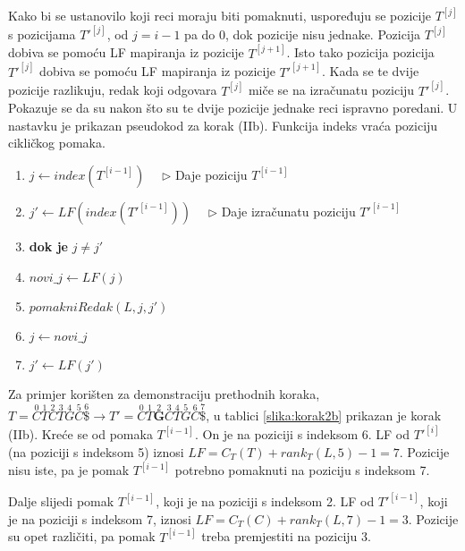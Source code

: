 \documentclass{ferseminar}
\begin{document}
Kako bi se ustanovilo koji reci moraju biti pomaknuti, uspoređuju se pozicije $T^{[j]}$ s pozicijama $T'^{[j]}$, od $j=i-1$ pa do $0$, dok pozicije nisu jednake. Pozicija $T^{[j]}$ dobiva se pomoću LF mapiranja iz pozicije $T^{[j+1]}$. Isto tako pozicija pozicija $T'^{[j]}$ dobiva se pomoću LF mapiranja iz pozicije $T'^{[j+1]}$. Kada se te dvije pozicije razlikuju, redak koji odgovara $T^{[j]}$ miče se na izračunatu poziciju $T'^{[j]}$. Pokazuje se da su nakon što su te dvije pozicije jednake reci ispravno poredani.
U nastavku je prikazan pseudokod za korak (IIb). Funkcija indeks vraća poziciju cikličkog pomaka.

\footnotesize
\begin{enumerate}
	\item $j\longleftarrow index(T^{[i-1]}) \quad$ $\triangleright$ Daje poziciju $T^{[i-1]}$
	\item $j'\longleftarrow LF(index(T'^{[i-1]})) \quad$ $\triangleright$ Daje izračunatu poziciju $T'^{[i-1]}$
	\item \textbf{dok je} $j\neq j'$
	\item \hspace{.1\textwidth} $novi\_j \longleftarrow LF(j) $
	\item \hspace{.1\textwidth} $pomakniRedak(L,j,j')$
	\item \hspace{.1\textwidth} $j \longleftarrow novi\_j $
	\item \hspace{.1\textwidth} $j' \longleftarrow LF(j') $
\end{enumerate}
\normalsize
Za primjer korišten za demonstraciju prethodnih koraka, $
	T=\overset{0}{C}	\overset{1}{T} \overset{2}{C} \overset{3}{T}	\overset{4}{G}
	\overset{5}{C}	\overset{6}{\$} \rightarrow		
	T'=\overset{0}{C}	\overset{1}{T}	\overset{2}{\boldsymbol{G}}  \overset{3}{C} \overset{4}{T}	\overset{5}{G}
	\overset{6}{C}	\overset{7}{\$} 	
$, u tablici \ref{slika:korak2b} prikazan je korak (IIb). Kreće se od pomaka $T^{[i-1]}$. On je na poziciji s indeksom 6. LF od $T'^{[i]}$ (na poziciji s indeksom 5) iznosi $LF=C_T(T)+rank_T(L,5)-1=7$. Pozicije nisu iste, pa je pomak $T^{[i-1]}$ potrebno pomaknuti na poziciju s indeksom 7.

Dalje slijedi pomak $T^{[i-1]}$, koji je na poziciji s indeksom 2. LF od $T'^{[i-1]}$, koji je na poziciji s indeksom 7, iznosi $LF=C_T(C)+rank_T(L,7)-1=3$. Pozicije su opet različiti, pa pomak $T^{[i-1]}$ treba premjestiti na poziciju 3.
\end{document}
